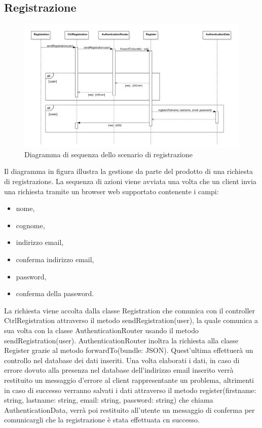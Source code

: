 \documentclass[a4paper, titlepage]{article}
\begin{document}
	\subsection{Registrazione}
	\begin{figure}[!h]
		\centering
		\includegraphics[scale=0.5]{Img/seq-register.pdf}
		\caption{Diagramma di sequenza dello scenario di registrazione}
	\end{figure}
	Il diagramma in figura illustra la gestione da parte del prodotto di una richiesta di registrazione. La sequenza di azioni viene avviata una volta che un client invia una richiesta tramite un browser web supportato contenente i campi: 
	\begin{itemize}
		\item nome,
		\item cognome,
		\item indirizzo email,
		\item conferma indirizzo email,
		\item password,
		\item conferma della password.
	\end{itemize}
	La richiesta viene accolta dalla classe Registration che comunica con il controller CtrlRegistration attraverso il metodo sendRegistration(user), la quale comunica a sua volta con la classe AuthenticationRouter usando il metodo sendRegistration(user).
	AuthenticationRouter inoltra la richiesta alla classe Register grazie al metodo forwardTo(bundle: JSON). Quest'ultima effettuerà un controllo nel database dei dati inseriti. Una volta elaborati i dati, in caso di errore dovuto alla presenza nel database dell'indirizzo email inserito verrà restituito un messaggio d'errore al client rappresentante un problema, altrimenti in caso di successo verranno salvati i dati attraverso il metodo register(firstname: string, lastname: string, email: string, password: string) che chiama AuthenticationData, verrà poi restituito all'utente un messaggio di conferma per comunicargli che la registrazione è stata effettuata cn successo.
	
\end{document}
